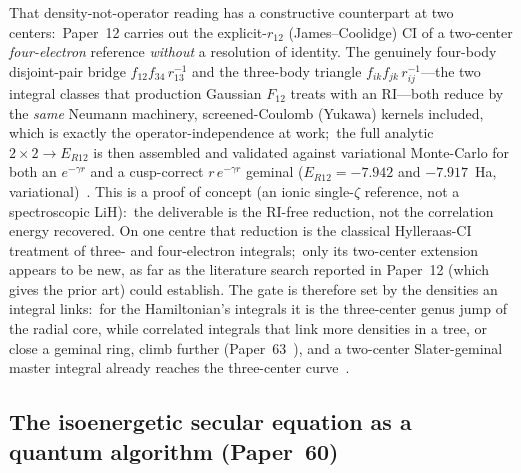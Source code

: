 \documentclass[aps,pra,twocolumn,superscriptaddress,longbibliography]{revtex4-2}
\begin{document}
That density-not-operator reading has a constructive counterpart at two
centers:\ Paper~12 carries out the
explicit-$r_{12}$ (James--Coolidge) CI of a two-center \emph{four-electron}
reference \emph{without} a resolution of identity.  The genuinely four-body
disjoint-pair bridge $f_{12}f_{34}\,r_{13}^{-1}$ and the three-body triangle
$f_{ik}f_{jk}\,r_{ij}^{-1}$---the two integral classes that production
Gaussian $F_{12}$ treats with an RI---both reduce by the \emph{same} Neumann machinery,
screened-Coulomb (Yukawa) kernels included, which is exactly the
operator-independence at work;\ the full analytic $2\times2\to E_{R12}$ is
then assembled and validated against variational Monte-Carlo for both an
$e^{-\gamma r}$ and a cusp-correct $r\,e^{-\gamma r}$ geminal
($E_{R12}=-7.942$ and $-7.917$~Ha, variational)~\cite{loutey_paper12}.  This
is a proof of concept (an ionic single-$\zeta$ reference, not a spectroscopic
LiH):\ the deliverable is the RI-free reduction, not the correlation energy
recovered.  On one centre that reduction is the classical Hylleraas-CI
treatment of three- and four-electron integrals;\ only its two-center
extension appears to be new, as far as the literature search reported in
Paper~12 (which gives the prior art) could establish.  The gate is therefore set by the
densities an integral links:\ for the Hamiltonian's integrals it is the
three-center genus jump of the radial core, while correlated integrals that
link more densities in a tree, or close a geminal ring, climb further
(Paper~63~\cite{loutey_paper63}), and a two-center Slater-geminal master
integral already reaches the three-center curve~\cite{loutey_paper59}.

\subsection{The isoenergetic secular equation as a quantum algorithm (Paper~60)}
\end{document}
